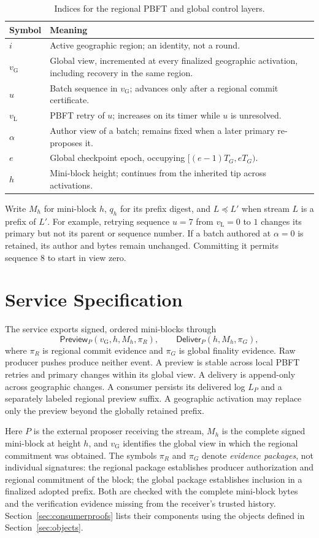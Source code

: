 \documentclass[11pt,a4paper,onecolumn]{article}
\newcommand{\gv}{v_{\mathrm G}}
\newcommand{\lv}{v_{\mathrm L}}
\newcommand{\pre}{\preceq}
\newcommand{\Tag}[1]{\mathsf{#1}}
\theoremstyle{remark}\newtheorem{example}[definition]{Example}
\begin{document}
\begin{table}[htbp]\centering\small
\begin{tabularx}{\textwidth}{@{}p{}Y@{}}\toprule
Symbol & Meaning\\\midrule
$i$ & Active geographic region; an identity, not a round.\\
$\gv$ & Global view, incremented at every finalized geographic activation,
including recovery in the same region.\\
$u$ & Batch sequence in $\gv$; advances only after a regional commit certificate.\\
$\lv$ & PBFT retry of $u$; increases on its timer while $u$ is unresolved.\\
$\alpha$ & Author view of a batch; remains fixed when a later primary re-proposes it.\\
$e$ & Global checkpoint epoch, occupying $[(e-1)T_G,eT_G)$.\\
$h$ & Mini-block height; continues from the inherited tip across activations.\\\bottomrule
\end{tabularx}
\caption{Indices for the regional PBFT and global control layers.}
\end{table}
Write $M_h$ for mini-block $h$, $q_h$ for its prefix digest, and $L\pre L'$
when stream $L$ is a prefix of $L'$. For example, retrying sequence $u=7$
from $\lv=0$ to $1$ changes its primary but not its parent or sequence number.
If a batch authored at $\alpha=0$ is retained, its author and bytes remain
unchanged. Committing it permits sequence $8$ to start in view zero.

\section{Service Specification}\label{sec:spec}
The service exports signed, ordered mini-blocks through
\[
 \Tag{Preview}_P(\gv,h,M_h,\pi_R),\qquad
 \Tag{Deliver}_P(h,M_h,\pi_G),
\]
where $\pi_R$ is regional commit evidence and $\pi_G$ is global finality evidence.
Raw producer pushes produce neither event. A preview is stable across local
PBFT retries and primary changes within its global view. A delivery is
append-only across geographic changes. A consumer persists its delivered log
$L_P$ and a separately labeled regional preview suffix. A geographic activation
may replace only the preview beyond the globally retained prefix.

Here $P$ is the external proposer receiving the stream, $M_h$ is the complete
signed mini-block at height $h$, and $\gv$ identifies the global view in which
the regional commitment was obtained. The symbols $\pi_R$ and $\pi_G$ denote
\emph{evidence packages}, not individual signatures: the regional package
establishes producer authorization and regional commitment of the block;
the global package establishes inclusion in a finalized adopted prefix.
Both are checked with the complete mini-block bytes and the verification
evidence missing from the receiver's trusted history. Section~\ref{sec:consumerproofs} lists
their components using the objects defined in Section~\ref{sec:objects}.
\end{document}
